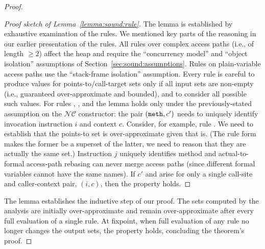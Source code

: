 \begin{theorem}
\begin{proof}
\begin{proof}[Proof sketch of Lemma~\ref{lemma:sound:rule}]
The lemma is established by exhaustive examination of the rules. We mentioned key parts of the reasoning in our earlier presentation of the rules. All rules over complex access paths (i.e., of length $\geq 2$) affect the heap and require the ``concurrency model'' and ``object isolation'' assumptions of Section~\ref{sec:sound:assumptions}. Rules on plain-variable access paths use the ``stack-frame isolation'' assumption. Every rule is careful to produce values for points-to/call-target sets only if all input sets are non-empty (i.e., guaranteed over-approximate and bounded), and to consider all possible such values.  For rules , , and  the lemma holds only under the previously-stated assumption on the $\mathcal{NC}$ constructor: the pair $(\texttt{meth}, c')$ needs to uniquely identify invocation instruction $i$ and context $c$. Consider, for example, rule . We need to establish that the points-to set  is over-approximate given that  is. (The rule form makes the former be a superset of the latter, we need to reason that they are actually the same set.) Instruction $j$ uniquely identifies method  and actual-to-formal access-path rebasing can never merge access paths (since different formal variables cannot have the same names). If $c'$ and  arise for only a single call-site and caller-context pair, $(i, c)$, then the property holds.
\end{proof}

The lemma establishes the inductive step of our proof. The sets computed by the analysis are initially over-approximate and remain over-approximate after every full evaluation of a single rule. At fixpoint, when full evaluation of any rule no longer changes the output sets, the property holds,  concluding the theorem's proof.
\end{proof}
\end{theorem}

